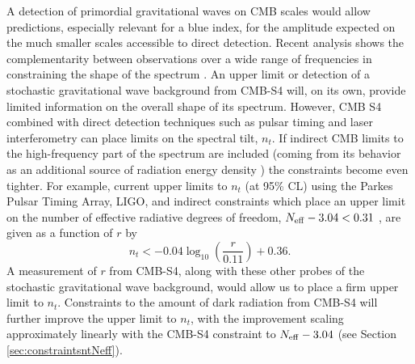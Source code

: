 A detection of primordial gravitational waves on CMB scales would allow predictions, especially relevant for a blue index, for the amplitude expected on the much smaller scales accessible to direct detection. Recent analysis shows the complementarity between observations over a wide range of frequencies in constraining the shape of the spectrum \cite{Lasky:2015lej,Meerburg:2015zua}.  An upper limit or detection of a stochastic gravitational wave background from CMB-S4 will, on its own, provide limited information on the overall shape of its spectrum.  However, CMB S4 combined with direct detection techniques such as pulsar timing and laser interferometry can place limits on the spectral tilt, $n_t$. If indirect CMB limits to the high-frequency part of the spectrum are included (coming from its behavior as an additional source of radiation energy density \cite{Smith:2006nka}) the constraints become even tighter. For example, current upper limits to $n_t$ (at 95\% CL) using the Parkes Pulsar Timing Array, LIGO, and indirect constraints which place an upper limit on the number of effective radiative degrees of freedom, $N_{\rm eff}-3.04 < 0.31$ \cite{Pagano:2015hma}, are given as a function of $r$ by \cite{Lasky:2015lej}
\begin{equation}
n_t < -0.04 \log_{10} \left(\frac{r}{0.11}\right) + 0.36.
\end{equation}
A measurement of $r$ from CMB-S4, along with these other probes of the stochastic gravitational wave background, would allow us to place a firm upper limit to $n_t$.  Constraints to the amount of dark radiation from CMB-S4 will further improve the upper limit to $n_t$, with the improvement scaling approximately linearly with the CMB-S4 constraint to $N_{\rm eff}-3.04$ \cite{Meerburg:2015zua} (see Section \ref{sec:constraintsntNeff}).  

